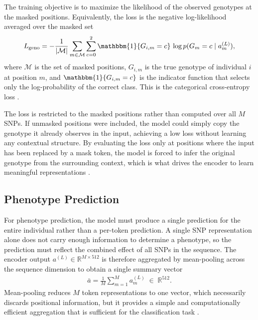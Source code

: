 The training objective is to maximize the likelihood of the observed
genotypes at the masked positions. Equivalently, the loss is the negative
log-likelihood averaged over the masked set
\begin{align}\label{eq: cross-entro loss}
    L_{\mathrm{geno}}
    = - \frac{1}{|\mathcal{M}|} \sum_{m \in \mathcal{M}} \sum_{c=0}^{2}
      \mathbbm{1}\{G_{i,m} = c\}\,
      \log p(G_m = c \mid a^{(L)}_m),
\end{align}
where $\mathcal{M}$ is the set of masked positions, $G_{i,m}$ is the
true genotype of individual $i$ at position $m$, and
$\mathbbm{1}\{G_{i,m} = c\}$ is the indicator function that selects only
the log-probability of the correct class. This is the categorical
cross-entropy loss \citep{PyTorchCrossEntropyLoss}.

The loss is restricted to the masked positions rather than computed over
all $M$ SNPs. If unmasked positions were included, the model could simply
copy the genotype it already observes in the input, achieving a low loss
without learning any contextual structure. By evaluating the loss only at
positions where the input has been replaced by a mask token, the model is
forced to infer the original genotype from the surrounding context, which
is what drives the encoder to learn meaningful representations
\citep{Devlin2019}.

\subsection{Phenotype Prediction} \label{sec:php}
For phenotype prediction, the model must produce a single prediction for the
entire individual rather than a per-token prediction. A single SNP
representation alone does not carry enough information to determine a
phenotype, so the prediction must reflect the combined effect of all SNPs in
the sequence. The encoder output $a^{(L)} \in \mathbb{R}^{M \times 512}$ is
therefore aggregated by mean-pooling across the sequence dimension to obtain
a single summary vector
\begin{align*}
    \bar{a} = \frac{1}{M} \sum_{m=1}^{M} a^{(L)}_m
    \;\in\; \mathbb{R}^{512}.
\end{align*}
Mean-pooling reduces $M$ token representations to one vector, which
necessarily discards positional information, but it provides a simple and
computationally efficient aggregation that is sufficient for the
classification task \citep{Gholamalinezhad2020}.

